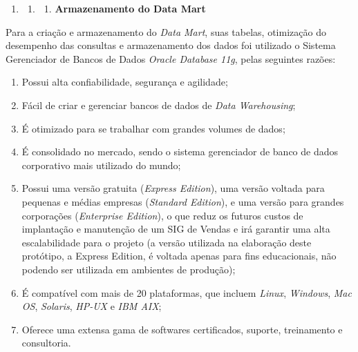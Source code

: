 \documentclass[a4paper]{article}
\newcounter{saveenum}
\newcommand\liststyleWWviiiNumi{%
\renewcommand\theenumi{\arabic{enumi}}
\renewcommand\theenumii{\arabic{enumi}.\arabic{enumii}}
\renewcommand\theenumiii{\arabic{enumi}.\arabic{enumii}.\arabic{enumiii}}
\renewcommand\theenumiv{\arabic{enumi}.\arabic{enumii}.\arabic{enumiii}.\arabic{enumiv}}
\renewcommand\labelenumi{\theenumi}
\renewcommand\labelenumii{\theenumii}
\renewcommand\labelenumiii{\theenumiii}
\renewcommand\labelenumiv{\theenumiv.}
}
\newcommand\liststyleWWviiiNumxiv{%
\renewcommand\theenumi{\alph{enumi}}
\renewcommand\theenumii{\alph{enumii}}
\renewcommand\theenumiii{\roman{enumiii}}
\renewcommand\theenumiv{\arabic{enumiv}}
\renewcommand\labelenumi{\theenumi)}
\renewcommand\labelenumii{\theenumii.}
\renewcommand\labelenumiii{\theenumiii.}
\renewcommand\labelenumiv{\theenumiv.}
}
\begin{document}
\liststyleWWviiiNumi
\setcounter{saveenum}{\value{enumi}}
\begin{enumerate}
\setcounter{enumi}{\value{saveenum}}
\item \setcounter{saveenum}{\value{enumii}}
\begin{enumerate}
\setcounter{enumii}{\value{saveenum}}
\item \setcounter{saveenum}{\value{enumiii}}
\begin{enumerate}
\setcounter{enumiii}{\value{saveenum}}
\item {
\textsf{\textbf{Armazenamento do Data Mart}}}
\end{enumerate}
\end{enumerate}
\end{enumerate}
{
\textsf{Para a cria\c{c}\~ao e armazenamento do }\textsf{\textit{Data Mart}}\textsf{, suas tabelas, otimiza\c{c}\~ao do
desempenho das consultas e armazenamento dos dados foi utilizado o Sistema Gerenciador de Bancos de Dados
}\textsf{\textit{Oracle Database 11g}}\textsf{, pelas seguintes raz\~oes: }}

\liststyleWWviiiNumxiv
\begin{enumerate}
\item {
\textsf{Possui alta confiabilidade, seguran\c{c}a e agilidade;}}
\item {
\textsf{F\'acil de criar e gerenciar bancos de dados de }\textsf{\textit{Data Warehousing}}\textsf{;}}
\item {\sffamily
\'E otimizado para se trabalhar com grandes volumes de dados;}
\item {
\textsf{\'E consolidado no mercado, sendo o sistema gerenciador de banco de dados corporativo mais utilizado do mundo;}}
\item {
\textsf{Possui uma vers\~ao gratuita (}\textsf{\textit{Express Edition}}\textsf{), uma vers\~ao voltada para pequenas e
m\'edias empresas (}\textsf{\textit{Standard Edition}}\textsf{), e uma vers\~ao para grandes corpora\c{c}\~oes
(}\textsf{\textit{Enterprise Edition}}\textsf{), o que reduz os futuros custos de implanta\c{c}\~ao e manuten\c{c}\~ao
de um SIG de Vendas e ir\'a garantir uma alta escalabilidade para o projeto (a vers\~ao utilizada na elabora\c{c}\~ao
deste prot\'otipo, a Express Edition, \'e voltada apenas para fins educacionais, n\~ao podendo ser utilizada em
ambientes de produ\c{c}\~ao);}}
\item {
\textsf{\'E compat\'ivel com mais de 20 plataformas, que incluem }\textsf{\textit{Linux}}\textsf{,
}\textsf{\textit{Windows}}\textsf{, }\textsf{\textit{Mac OS}}\textsf{, }\textsf{\textit{Solaris}}\textsf{,
}\textsf{\textit{HP-UX}}\textsf{ e }\textsf{\textit{IBM AIX}}\textsf{;}}
\item {\sffamily
Oferece uma extensa gama de softwares certificados, suporte, treinamento e consultoria.}
\end{enumerate}
\end{document}
